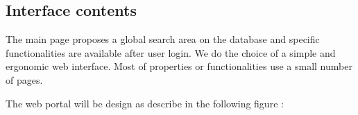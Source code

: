 \begin{figure}[htbp]
	\centering
\end{figure}


\subsection{Interface contents}
\hspace*{\parindent}
The main page proposes a global search area on the database and specific functionalities are available after user login.
We do the choice of a simple and ergonomic web interface. Most of properties or functionalities use a small number of pages.

The web portal will be design as describe in the following figure :

\begin{figure}[htbp]
	\centering
\end{figure}



